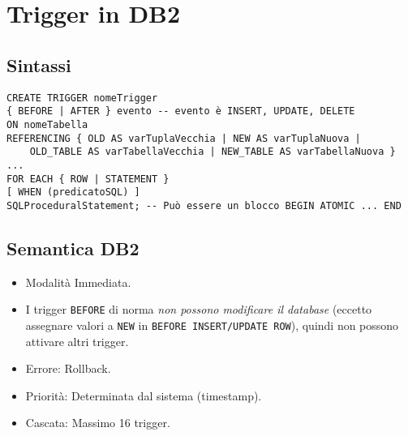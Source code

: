 	\section{Trigger in DB2}
	\subsection{Sintassi}
	\begin{verbatim}
CREATE TRIGGER nomeTrigger
{ BEFORE | AFTER } evento -- evento è INSERT, UPDATE, DELETE
ON nomeTabella
REFERENCING { OLD AS varTuplaVecchia | NEW AS varTuplaNuova |
	OLD_TABLE AS varTabellaVecchia | NEW_TABLE AS varTabellaNuova } ...
FOR EACH { ROW | STATEMENT }
[ WHEN (predicatoSQL) ]
SQLProceduralStatement; -- Può essere un blocco BEGIN ATOMIC ... END
	\end{verbatim}
	
	\subsection{Semantica DB2}
	\begin{itemize}
		\item Modalità Immediata.
		\item I trigger \texttt{BEFORE} di norma \textit{non possono modificare il database} (eccetto assegnare valori a \texttt{NEW} in \texttt{BEFORE INSERT/UPDATE ROW}), quindi non possono attivare altri trigger.
		\item Errore: Rollback.
		\item Priorità: Determinata dal sistema (timestamp).
		\item Cascata: Massimo 16 trigger.
	\end{itemize}
	
